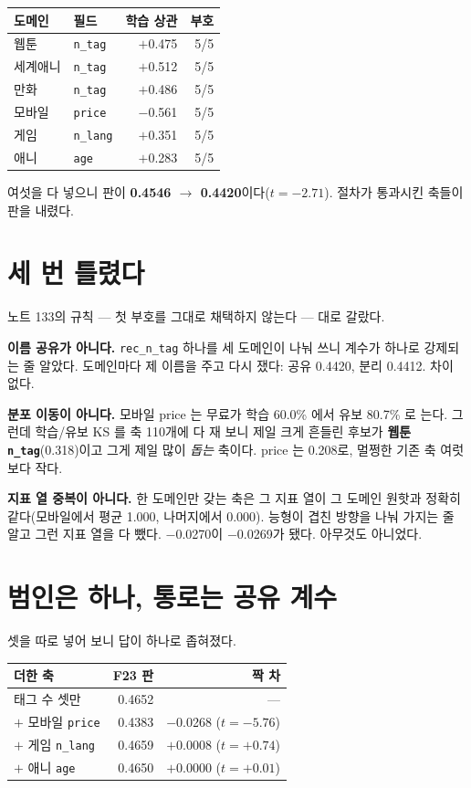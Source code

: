 \documentclass[10pt]{article}
\begin{document}
\begin{center}\small
\begin{tabular}{llrr}
\hline
도메인 & 필드 & 학습 상관 & 부호 \\
\hline
웹툰 & \texttt{n\_tag} & $+$0.475 & 5/5 \\
세계애니 & \texttt{n\_tag} & $+$0.512 & 5/5 \\
만화 & \texttt{n\_tag} & $+$0.486 & 5/5 \\
모바일 & \texttt{price} & $-$0.561 & 5/5 \\
게임 & \texttt{n\_lang} & $+$0.351 & 5/5 \\
애니 & \texttt{age} & $+$0.283 & 5/5 \\
\hline
\end{tabular}
\end{center}

여섯을 다 넣으니 판이 \textbf{0.4546 $\to$ 0.4420}이다($t{=}-2.71$). 절차가
통과시킨 축들이 판을 내렸다.

\section{세 번 틀렸다}

노트 133의 규칙 --- 첫 부호를 그대로 채택하지 않는다 --- 대로 갈랐다.

\textbf{이름 공유가 아니다.} \texttt{rec\_n\_tag} 하나를 세 도메인이 나눠 쓰니
계수가 하나로 강제되는 줄 알았다. 도메인마다 제 이름을 주고 다시 쟀다: 공유
0.4420, 분리 0.4412. 차이 없다.

\textbf{분포 이동이 아니다.} 모바일 price 는 무료가 학습 60.0\% 에서 유보
80.7\% 로 는다. 그런데 학습/유보 KS 를 축 110개에 다 재 보니 제일 크게 흔들린
후보가 \textbf{웹툰 \texttt{n\_tag}}(0.318)이고 그게 제일 많이 \emph{돕는}
축이다. price 는 0.208로, 멀쩡한 기존 축 여럿보다 작다.

\textbf{지표 열 중복이 아니다.} 한 도메인만 갖는 축은 그 지표 열이 그 도메인
원핫과 정확히 같다(모바일에서 평균 1.000, 나머지에서 0.000). 능형이 겹친
방향을 나눠 가지는 줄 알고 그런 지표 열을 다 뺐다. $-$0.0270이 $-$0.0269가
됐다. 아무것도 아니었다.

\section{범인은 하나, 통로는 공유 계수}

셋을 따로 넣어 보니 답이 하나로 좁혀졌다.

\begin{center}\small
\begin{tabular}{lrr}
\hline
더한 축 & F23 판 & 짝 차 \\
\hline
태그 수 셋만 & 0.4652 & --- \\
$+$ 모바일 \texttt{price} & 0.4383 & $-$0.0268 ($t{=}-5.76$) \\
$+$ 게임 \texttt{n\_lang} & 0.4659 & $+$0.0008 ($t{=}+0.74$) \\
$+$ 애니 \texttt{age} & 0.4650 & $+$0.0000 ($t{=}+0.01$) \\
\hline
\end{tabular}
\end{center}
\end{document}
